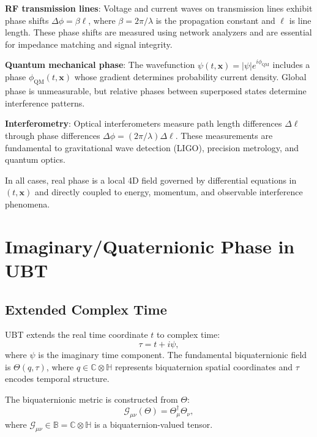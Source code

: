 \documentclass[12pt]{article}
\begin{document}
\textbf{RF transmission lines}: Voltage and current waves on transmission lines exhibit phase shifts $\Delta\phi = \beta \ell$, where $\beta = 2\pi/\lambda$ is the propagation constant and $\ell$ is line length. These phase shifts are measured using network analyzers and are essential for impedance matching and signal integrity.

\textbf{Quantum mechanical phase}: The wavefunction $\psi(t, \mathbf{x}) = |\psi| e^{i\phi_{\text{QM}}}$ includes a phase $\phi_{\text{QM}}(t, \mathbf{x})$ whose gradient determines probability current density. Global phase is unmeasurable, but relative phases between superposed states determine interference patterns.

\textbf{Interferometry}: Optical interferometers measure path length differences $\Delta \ell$ through phase differences $\Delta\phi = (2\pi/\lambda) \Delta \ell$. These measurements are fundamental to gravitational wave detection (LIGO), precision metrology, and quantum optics.

In all cases, real phase is a local 4D field governed by differential equations in $(t, \mathbf{x})$ and directly coupled to energy, momentum, and observable interference phenomena.

\section{Imaginary/Quaternionic Phase in UBT}

\subsection{Extended Complex Time}

UBT extends the real time coordinate $t$ to complex time:
\begin{equation}
\tau = t + i\psi,
\label{eq:complex_time}
\end{equation}
where $\psi$ is the imaginary time component. The fundamental biquaternionic field is $\Theta(q, \tau)$, where $q \in \mathbb{C} \otimes \mathbb{H}$ represents biquaternion spatial coordinates and $\tau$ encodes temporal structure.

The biquaternionic metric is constructed from $\Theta$:
\begin{equation}
\mathcal{G}_{\mu\nu}(\Theta) = \Theta_\mu^\dagger \Theta_\nu,
\label{eq:biq_metric}
\end{equation}
where $\mathcal{G}_{\mu\nu} \in \mathbb{B} = \mathbb{C} \otimes \mathbb{H}$ is a biquaternion-valued tensor.
\end{document}
